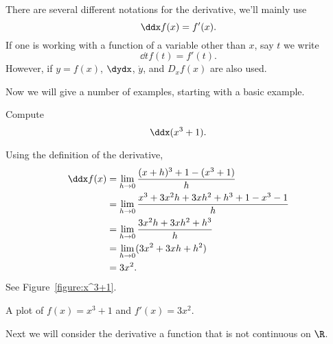 \break

\begin{definition}
There are several different notations for the derivative, we'll mainly
use
\[
\ddx f(x) = f'(x).
\]
If one is working with a function of a variable other than $x$, say $t$ we write
\[
\dd{t} f(t) = f'(t).
\]
However, if $y = f(x)$, $\dydx$, $\dot{y}$, and $D_x f(x)$ are
also used.
\end{definition}

Now we will give a number of examples, starting with a basic example.

\begin{example}
Compute 
\[
\ddx (x^3 + 1).
\] 
\end{example}

\begin{solution}
Using the definition of the derivative,
\begin{align*}
\ddx f(x) &= \lim_{h\to 0}\frac{(x+h)^3 + 1 - (x^3 +1)}{h}\\
&= \lim_{h\to 0}\frac{x^3+3x^2h+3xh^2 + h^3 + 1 - x^3 -1}{h}\\
&= \lim_{h\to 0}\frac{3x^2h+3xh^2 + h^3}{h}\\
&= \lim_{h\to 0}(3x^2+3xh + h^2)\\
&= 3x^2.
\end{align*}
See Figure~\ref{figure:x^3+1}.
\end{solution}
\begin{marginfigure}[0in]
\caption{A plot of $f(x) = x^3+1$ and $f'(x) = 3x^2$.}
\label{figure:x^3+1}
\end{marginfigure}


Next we will consider the derivative a function that is not continuous
on $\R$.


